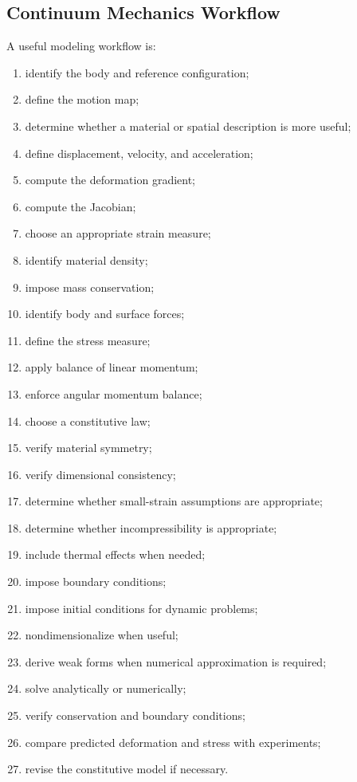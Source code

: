 \subsection{Continuum Mechanics Workflow}
\label{subsec:continuum-mechanics-workflow}

A useful modeling workflow is:

\begin{enumerate}
    \item identify the body and reference configuration;
    \item define the motion map;
    \item determine whether a material or spatial description is more useful;
    \item define displacement, velocity, and acceleration;
    \item compute the deformation gradient;
    \item compute the Jacobian;
    \item choose an appropriate strain measure;
    \item identify material density;
    \item impose mass conservation;
    \item identify body and surface forces;
    \item define the stress measure;
    \item apply balance of linear momentum;
    \item enforce angular momentum balance;
    \item choose a constitutive law;
    \item verify material symmetry;
    \item verify dimensional consistency;
    \item determine whether small-strain assumptions are appropriate;
    \item determine whether incompressibility is appropriate;
    \item include thermal effects when needed;
    \item impose boundary conditions;
    \item impose initial conditions for dynamic problems;
    \item nondimensionalize when useful;
    \item derive weak forms when numerical approximation is required;
    \item solve analytically or numerically;
    \item verify conservation and boundary conditions;
    \item compare predicted deformation and stress with experiments;
    \item revise the constitutive model if necessary.
\end{enumerate}

